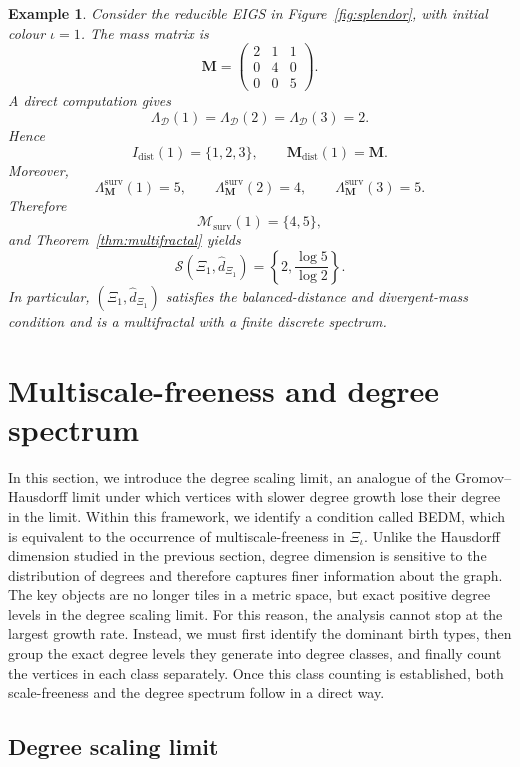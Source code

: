 \documentclass[12pt]{iopart}
\newtheorem{example}[theorem]{Example}
\newcommand*{\dist}{d}
\begin{document}
\begin{example}
Consider the reducible EIGS in Figure~\ref{fig:splendor}, with initial colour $\iota=1$.
The mass matrix is
\[
\mathbf M=
\begin{pmatrix}
2&1&1\\
0&4&0\\
0&0&5
\end{pmatrix}.
\]
A direct computation gives
\[
\Lambda_{\mathcal D}(1)=\Lambda_{\mathcal D}(2)=\Lambda_{\mathcal D}(3)=2.
\]
Hence
\[
I_{\mathrm{dist}}(1)=\{1,2,3\},
\qquad
\mathbf M_{\mathrm{dist}}(1)=\mathbf M.
\]
Moreover,
\[
\Lambda_{\mathbf M}^{\mathrm{surv}}(1)=5,\qquad
\Lambda_{\mathbf M}^{\mathrm{surv}}(2)=4,\qquad
\Lambda_{\mathbf M}^{\mathrm{surv}}(3)=5.
\]
Therefore
\[
\mathscr M_{\mathrm{surv}}(1)=\{4,5\},
\]
and Theorem~\ref{thm:multifractal} yields
\[
{ 
\mathscr S(\Xi_1,\hat\dist_{\Xi_1})}
=
\left\{
2,
\frac{\log 5}{\log 2}
\right\}.
\]
In particular, $(\Xi_1,\hat\dist_{\Xi_1})$ satisfies the balanced-distance and divergent-mass condition and is a multifractal with a finite discrete spectrum.
\end{example}

\section{Multiscale-freeness and degree spectrum}

In this section, we introduce the degree scaling limit, an analogue of the Gromov--Hausdorff limit under which vertices with slower degree growth lose their degree in the limit.
Within this framework, we identify a condition called BEDM, which is equivalent to the occurrence of multiscale-freeness in $\Xi_\iota$.
Unlike the Hausdorff dimension studied in the previous section, degree dimension is sensitive to the distribution of degrees and therefore captures finer information about the graph.
The key objects are no longer tiles in a metric space, but exact positive degree levels in the degree scaling limit.
For this reason, the analysis cannot stop at the largest growth rate.
Instead, we must first identify the dominant birth types, then group the exact degree levels they generate into degree classes, and finally count the vertices in each class separately.
Once this class counting is established, both scale-freeness and the degree spectrum follow in a direct way.

\subsection{Degree scaling limit}
\end{document}
